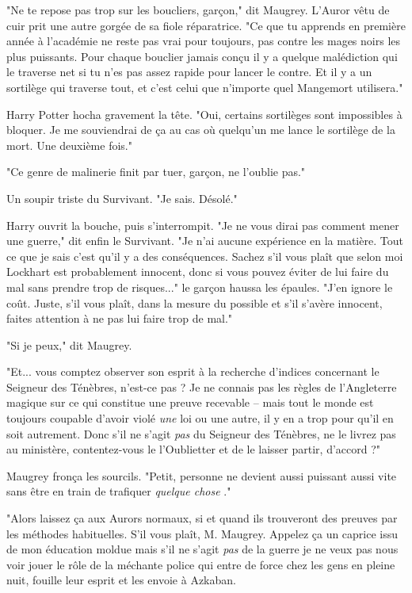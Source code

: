 "Ne te repose pas trop sur les boucliers, garçon," dit Maugrey. L'Auror vêtu de cuir prit une autre gorgée de sa fiole réparatrice. "Ce que tu apprends en première année à l'académie ne reste pas vrai pour toujours, pas contre les mages noirs les plus puissants. Pour chaque bouclier jamais conçu il y a quelque malédiction qui le traverse net si tu n'es pas assez rapide pour lancer le contre. Et il y a un sortilège qui traverse tout, et c'est celui que n'importe quel Mangemort utilisera."

Harry Potter hocha gravement la tête. "Oui, certains sortilèges sont impossibles à bloquer. Je me souviendrai de ça au cas où quelqu'un me lance le sortilège de la mort. Une deuxième fois."

"Ce genre de malinerie finit par tuer, garçon, ne l'oublie pas."

Un soupir triste du Survivant. "Je sais. Désolé."

Harry ouvrit la bouche, puis s'interrompit. "Je ne vous dirai pas comment mener une guerre," dit enfin le Survivant. "Je n'ai aucune expérience en la matière. Tout ce que je sais c'est qu'il y a des conséquences. Sachez s'il vous plaît que selon moi Lockhart est probablement innocent, donc si vous pouvez éviter de lui faire du mal sans prendre trop de risques..." le garçon haussa les épaules. "J'en ignore le coût. Juste, s'il vous plaît, dans la mesure du possible et s'il s'avère innocent, faites attention à ne pas lui faire trop de mal."

"Si je peux," dit Maugrey.

"Et... vous comptez observer son esprit à la recherche d'indices concernant le Seigneur des Ténèbres, n'est-ce pas ? Je ne connais pas les règles de l'Angleterre magique sur ce qui constitue une preuve recevable – mais tout le monde est toujours coupable d'avoir violé \emph{une } loi ou une autre, il y en a trop pour qu'il en soit autrement. Donc s'il ne s'agit \emph{pas}  du Seigneur des Ténèbres, ne le livrez pas au ministère, contentez-vous le l'Oublietter et de le laisser partir, d'accord ?"

Maugrey fronça les sourcils. "Petit, personne ne devient aussi puissant aussi vite sans être en train de trafiquer \emph{quelque chose} ."

"Alors laissez ça aux Aurors normaux, si et quand ils trouveront des preuves par les méthodes habituelles. S'il vous plaît, M. Maugrey. Appelez ça un caprice issu de mon éducation moldue mais s'il ne s'agit \emph{pas}  de la guerre je ne veux pas nous voir jouer le rôle de la méchante police qui entre de force chez les gens en pleine nuit, fouille leur esprit et les envoie à Azkaban.

